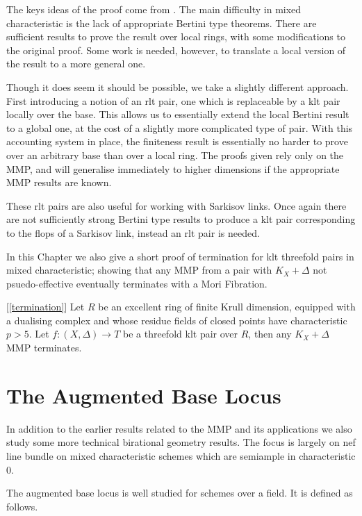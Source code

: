 \documentclass[a4paper,12pt]{book}
\begin{document}
	The keys ideas of the proof come from \cite{BCHM10}. The main difficulty in mixed characteristic is the lack of appropriate Bertini type theorems. There are sufficient results to prove the result over local rings, with some modifications to the original proof. Some work is needed, however, to translate a local version of the result to a more general one. 
	
	Though it does seem it should be possible, we take a slightly different approach. First introducing a notion of an rlt pair, one which is replaceable by a klt pair locally over the base. This allows us to essentially extend the local Bertini result to a global one, at the cost of a slightly more complicated type of pair. With this accounting system in place, the finiteness result is essentially no harder to prove over an arbitrary base than over a local ring. The proofs given rely only on the MMP, and will generalise immediately to higher dimensions if the appropriate MMP results are known. 
	
	These rlt pairs are also useful for working with Sarkisov links. Once again there are not sufficiently strong Bertini type results to produce a klt pair corresponding to the flops of a Sarkisov link, instead an rlt pair is needed.
	
	In this Chapter we also give a short proof of termination for klt threefold pairs in mixed characteristic; showing that any MMP from a pair with $K_{X}+\Delta$ not psuedo-effective eventually terminates with a Mori Fibration.
	
	\begin{theo}\label{Main_Finite3}[\autoref{termination}]
		Let $R$ be an excellent ring of finite Krull dimension, equipped with a dualising complex and whose residue fields of closed points have characteristic $p>5$.
		Let $f:(X,\Delta) \to T$ be a threefold klt pair over $R$, then any $K_{X}+\Delta$ MMP terminates.
	\end{theo}
	
	\section{The Augmented Base Locus}
	
	In addition to the earlier results related to the MMP and its applications we also study some more technical birational geometry results. The focus is largely on nef line bundle on mixed characteristic schemes which are semiample in characteristic $0$.
	
	The augmented base locus is well studied for schemes over a field. It is defined as follows.
	
\end{document}
